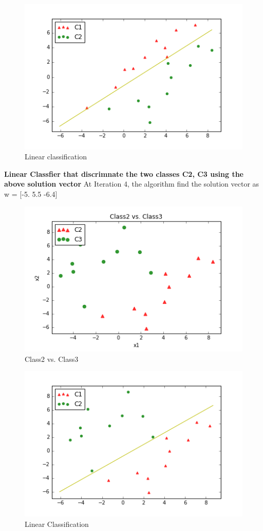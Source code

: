 \documentclass[10pt,a4paper]{article}
\begin{document}
\graphicspath{ {/images/} }
\begin{figure}[h!]
\centering
\includegraphics[scale=0.5]{images/P1_C12_classified.png}
  \caption{Linear classification}
  \label{fig:p12}
\end{figure}

\textbf{Linear Classfier that discrimnate the two classes C2, C3 using the above solution vector}
At Iteration 4, the algorithm find the solution vector as w = [-5. 5.5 -6.4]

\graphicspath{ {/images/} }
\begin{figure}[h!]
\centering
\includegraphics[scale=0.5]{images/P1_C2C3.png}
  \caption{Class2 vs. Class3}
  \label{fig:p13}
\end{figure}

\graphicspath{ {/images/} }

\begin{figure}[h!]
\centering
\includegraphics[scale=0.5]{images/P1_C23_classified.png}
  \caption{Linear Classification }
  \label{fig:p14}
\end{figure}
\end{document}
